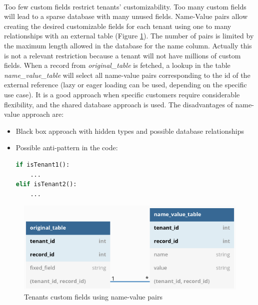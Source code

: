 \documentclass[12pt,english]{article} %
\begin{document}
\

Too few custom fields restrict tenants' customizability.
Too many custom fields will lead to a sparse database with many unused fields.
Name‐Value pairs allow creating the desired customizable fields for each tenant \cite{multi-tenant-data-architecture} using one to many relationships with an external table (Figure \ref{fig:name-value-pairs-database}).
The number of pairs is limited by the maximum length allowed in the database for the name column. Actually this is not a relevant restriction because a tenant will not have millions of custom fields.
When a record from \textit{original\_table} is fetched, a lookup in the table \textit{name\_value\_table} will select all name-value pairs corresponding to the id of the external reference (lazy or eager loading can be used, depending on the specific use case).
It is a good approach when specific customers require considerable flexibility, and the shared database approach is used. 
The disadvantages of name-value approach are:
\begin{itemize}
    \item Black box approach with hidden types and possible database relationships
    \item Possible anti-pattern in the code:
\begin{lstlisting}[language=python,numbers=none]
if isTenant1():
    ...
elif isTenant2():
    ...
\end{lstlisting}
\end{itemize}

\begin{figure}[H]
    \centering
    \includegraphics[scale=0.5]{img/db/extensibility/name-value-pairs.png}
    \caption{Tenants custom fields using name-value pairs \cite{multi-tenant-data-architecture}}
    \label{fig:name-value-pairs-database}
\end{figure}

\end{document}
